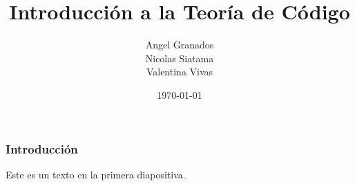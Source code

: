 \documentclass[spanish]{beamer}
\title{Introducción a la Teoría de Código}
\author{Angel Granados \\ Nicolas Siatama \\ Valentina Vivas}
\institute{Universidad Distrital Francisco José de Caldas \\ Gabriel Bravo Ríos}
\date{\today}
\begin{document}
	
	\frame{\titlepage}
	
	
	\begin{frame}
		\frametitle{Introducción}
		Este es un texto en la primera diapositiva.
	\end{frame}
	
	
	
	
	
	 
	

	
\end{document}
